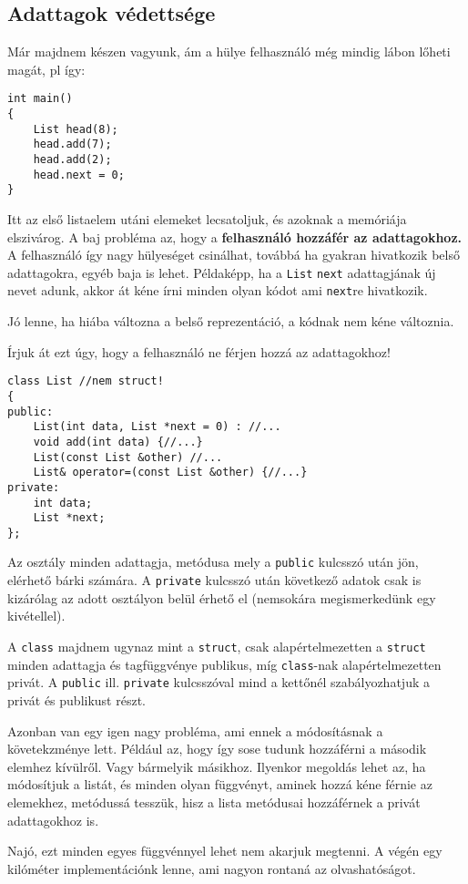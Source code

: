 \documentclass[a4paper,11.5pt]{article}
\begin{document}
	\subsection{Adattagok védettsége}
	Már majdnem készen vagyunk, ám a hülye felhasználó még mindig lábon lőheti magát, pl így:
	\begin{lstlisting}
int main()
{
	List head(8);
	head.add(7);
	head.add(2);
	head.next = 0;
}
	\end{lstlisting}
	Itt az első listaelem utáni elemeket lecsatoljuk, és azoknak a memóriája elszivárog. A baj probléma az, hogy a \textbf{felhasználó hozzáfér az adattagokhoz.} A felhasználó így nagy hülyeséget csinálhat, továbbá ha gyakran hivatkozik belső adattagokra, egyéb baja is lehet. Példaképp, ha a \texttt{List} \texttt{next} adattagjának új nevet adunk, akkor át kéne írni minden olyan kódot ami \texttt{next}re hivatkozik.
	
	Jó lenne, ha hiába változna a belső reprezentáció, a kódnak nem kéne változnia. 
	
	Írjuk át ezt úgy, hogy a felhasználó ne férjen hozzá az adattagokhoz!

\begin{lstlisting}
class List //nem struct!
{
public:
	List(int data, List *next = 0) : //...
	void add(int data) {//...}
	List(const List &other) //...
	List& operator=(const List &other) {//...}
private:
	int data;
	List *next;
};
\end{lstlisting}
	Az osztály minden adattagja, metódusa mely a \texttt{public} kulcsszó után jön, elérhető bárki számára. A \texttt{private} kulcsszó után következő adatok csak is kizárólag az adott osztályon belül érhető el (nemsokára megismerkedünk egy kivétellel).

	A \texttt{class} majdnem ugynaz mint a \texttt{struct}, csak alapértelmezetten a \texttt{struct} minden adattagja és tagfüggvénye publikus, míg \texttt{class}-nak alapértelmezetten privát. A \texttt{public} ill. \texttt{private} kulcsszóval mind a kettőnél szabályozhatjuk a privát és publikust részt.
	
	\medskip
	Azonban van egy igen nagy probléma, ami ennek a módosításnak a követekzménye lett. Például az, hogy így sose tudunk hozzáférni a második elemhez kívülről. Vagy bármelyik másikhoz. Ilyenkor megoldás lehet az, ha módosítjuk a listát, és minden olyan függvényt,  aminek hozzá kéne férnie az elemekhez, metódussá tesszük, hisz a lista metódusai hozzáférnek a privát adattagokhoz is.
	
	Najó, ezt minden egyes függvénnyel lehet nem akarjuk megtenni. A végén egy kilóméter implementációnk lenne, ami nagyon rontaná az olvashatóságot.
	
\end{document}
